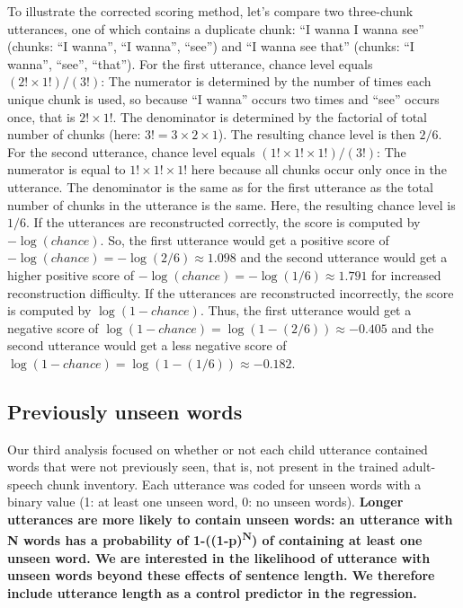 \documentclass[man,mask,floatsintext]{apa6}
\begin{document}
To illustrate the corrected scoring method, let's compare two
three-chunk utterances, one of which contains a duplicate chunk:
\enquote{I wanna I wanna see} (chunks: \enquote{I wanna}, \enquote{I
wanna}, \enquote{see}) and \enquote{I wanna see that} (chunks:
\enquote{I wanna}, \enquote{see}, \enquote{that}). For the first
utterance, chance level equals \((2!\times1!)/(3!)\): The numerator is
determined by the number of times each unique chunk is used, so because
\enquote{I wanna} occurs two times and \enquote{see} occurs once, that
is \(2!\times1!\). The denominator is determined by the factorial of
total number of chunks (here: \(3! = 3\times2\times1\)). The resulting
chance level is then \(2/6\). For the second utterance, chance level
equals \((1!\times1!\times1!)/(3!)\): The numerator is equal to
\(1!\times1!\times1!\) here because all chunks occur only once in the
utterance. The denominator is the same as for the first utterance as the
total number of chunks in the utterance is the same. Here, the resulting
chance level is \(1/6\). If the utterances are reconstructed correctly,
the score is computed by \(-\log(chance)\). So, the first utterance
would get a positive score of
\(-\log(chance) = -\log(2/6) \approx 1.098\) and the second utterance
would get a higher positive score of
\(-\log(chance) = -\log(1/6) \approx 1.791\) for increased
reconstruction difficulty. If the utterances are reconstructed
incorrectly, the score is computed by \(\log(1-chance)\). Thus, the
first utterance would get a negative score of
\(\log(1-chance) = \log(1-(2/6)) \approx -0.405\) and the second
utterance would get a less negative score of
\(\log(1-chance) = \log(1-(1/6)) \approx -0.182\).

\subsection{Previously unseen words}\label{previously-unseen-words}

Our third analysis focused on whether or not each child utterance
contained words that were not previously seen, that is, not present in
the trained adult-speech chunk inventory. Each utterance was coded for
unseen words with a binary value (1: at least one unseen word, 0: no
unseen words). \textbf{Longer utterances are more likely to contain
unseen words: an utterance with N words has a probability of
1-((1-p)\textsuperscript{N}) of containing at least one unseen word. We
are interested in the likelihood of utterance with unseen words beyond
these effects of sentence length. We therefore include utterance length
as a control predictor in the regression.}
\end{document}
